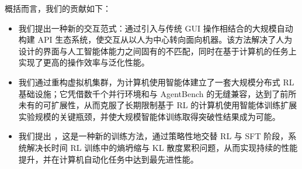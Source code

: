 概括而言，我们的贡献如下：
\begin{itemize}[leftmargin=*,itemsep=0pt,parsep=0.2em,topsep=0.2em,partopsep=0.0em]
    \item 我们提出一种新的交互范式：通过引入与传统 GUI 操作相结合的大规模自动构建 API 生态系统，使交互从以人为中心转向面向机器。该方法解决了人为设计的界面与人工智能体能力之间固有的不匹配，同时在基于计算机的任务上实现了更高的操作效率与泛化性能。
    \item 我们通过重构虚拟机集群，为计算机使用智能体建立了一套大规模分布式 RL 基础设施；它凭借数千个并行环境和与 AgentBench 的无缝兼容，达到了前所未有的可扩展性，从而克服了长期限制基于 RL 的计算机使用智能体训练扩展实验规模的关键瓶颈，并使大规模智能体训练取得突破性结果成为可能。
    \item 我们提出 \rlmethod，这是一种新的训练方法，通过策略性地交替 RL 与 SFT 阶段，系统解决长时间 RL 训练中的熵坍缩与 KL 散度累积问题，从而实现持续的性能提升，并在计算机自动化任务中达到最先进性能。
\end{itemize}
